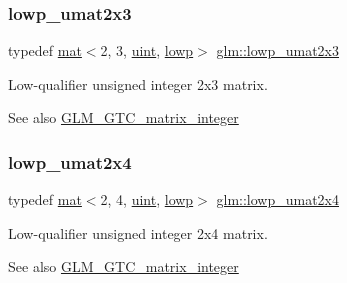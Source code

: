 \subsubsection{\texorpdfstring{lowp\+\_\+umat2x3}{lowp\_umat2x3}}
{\footnotesize\ttfamily typedef \mbox{\hyperlink{structglm_1_1mat}{mat}}$<$2, 3, \mbox{\hyperlink{group__core__precision_ga4fd29415871152bfb5abd588334147c8}{uint}}, \mbox{\hyperlink{namespaceglm_a36ed105b07c7746804d7fdc7cc90ff25ae161af3fc695e696ce3bf69f7332bc2d}{lowp}}$>$ \mbox{\hyperlink{group__gtc__matrix__integer_gafd5d32892f45c112f974b8d91fc4e25a}{glm\+::lowp\+\_\+umat2x3}}}

Low-\/qualifier unsigned integer 2x3 matrix. \begin{DoxySeeAlso}{See also}
\mbox{\hyperlink{group__gtc__matrix__integer}{G\+L\+M\+\_\+\+G\+T\+C\+\_\+matrix\+\_\+integer}} 
\end{DoxySeeAlso}
\mbox{\label{group__gtc__matrix__integer_ga5676b5ed80e507b06b1ac9210a7098df}} 
\subsubsection{\texorpdfstring{lowp\+\_\+umat2x4}{lowp\_umat2x4}}
{\footnotesize\ttfamily typedef \mbox{\hyperlink{structglm_1_1mat}{mat}}$<$2, 4, \mbox{\hyperlink{group__core__precision_ga4fd29415871152bfb5abd588334147c8}{uint}}, \mbox{\hyperlink{namespaceglm_a36ed105b07c7746804d7fdc7cc90ff25ae161af3fc695e696ce3bf69f7332bc2d}{lowp}}$>$ \mbox{\hyperlink{group__gtc__matrix__integer_ga5676b5ed80e507b06b1ac9210a7098df}{glm\+::lowp\+\_\+umat2x4}}}

Low-\/qualifier unsigned integer 2x4 matrix. \begin{DoxySeeAlso}{See also}
\mbox{\hyperlink{group__gtc__matrix__integer}{G\+L\+M\+\_\+\+G\+T\+C\+\_\+matrix\+\_\+integer}} 
\end{DoxySeeAlso}
\mbox{\label{group__gtc__matrix__integer_gaab0c883cd04a3684accd02854daa7b1d}} 
